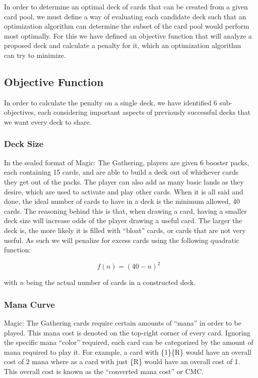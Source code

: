 \documentclass[12pt, letterpaper]{article}
\begin{document}
In order to determine an optimal deck of cards that can be created from a given card pool,
we must define a way of evaluating each candidate deck
such that an optimization algorithm can determine
the subset of the card pool would perform most optimally.
For this we have defined an objective function that will analyze a proposed deck
and calculate a penalty for it, which an optimization algorithm can try to minimize.

\subsection{Objective Function}

In order to calculate the penalty on a single deck,
we have identified 6 sub-objectives, each considering
important aspects of previously successful decks that we want every deck to share.

\subsubsection{Deck Size}
\label{objective:Deck Size}

In the sealed format of Magic: The Gathering,
players are given 6 booster packs, each containing 15 cards,
and are able to build a deck out of whichever cards they get out of the packs.
The player can also add as many basic lands as they desire,
which are used to activate and play other cards.
When it is all said and done,
the ideal number of cards to have in a deck is the minimum allowed, 40 cards.
The reasoning behind this is that, when drawing a card,
having a smaller deck size will increase odds of the player drawing a useful card.
The larger the deck is,
the more likely it is filled with \enquote{bloat} cards,
or cards that are not very useful.
As such we will penalize for excess cards using the following quadratic function:

$$
f(n) = (40 - n) ^ 2
$$

with $ n $ being the actual number of cards in a constructed deck.

\subsubsection{Mana Curve}
\label{objective:Mana Curve}

Magic: The Gathering cards require certain amounts of \enquote{mana} in order to be played.
This mana cost is denoted on the top-right corner of every card.
Ignoring the specific mana \enquote{color} required,
each card can be categorized by the amount of mana required to play it.
For example, a card with \{1\}\{R\} would have an overall cost of 2 mana
where as a card with just \{R\} would have an overall cost of 1.
This overall cost is known as the \enquote{converted mana cost} or CMC.
\end{document}
